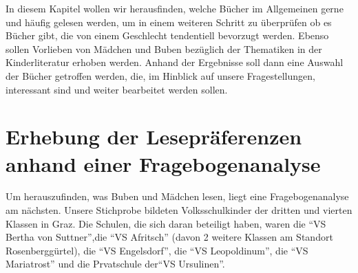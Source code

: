 In diesem Kapitel wollen wir herausfinden, welche Bücher im Allgemeinen
gerne und häufig gelesen werden, um in einem weiteren Schritt zu
überprüfen ob es Bücher gibt, die von einem Geschlecht tendentiell
bevorzugt werden. Ebenso sollen Vorlieben von Mädchen und Buben
bezüglich der Thematiken in der Kinderliteratur erhoben werden. Anhand
der Ergebnisse soll dann eine Auswahl der Bücher getroffen werden, die,
im Hinblick auf unsere Fragestellungen, interessant sind und weiter
bearbeitet werden sollen.

\section{Erhebung der Lesepräferenzen anhand einer Fragebogenanalyse}

Um herauszufinden, was Buben und Mädchen lesen, liegt eine
Fragebogenanalyse am nächsten. Unsere Stichprobe bildeten
Volksschulkinder der dritten und vierten Klassen in Graz. Die Schulen,
die sich daran beteiligt haben, waren die ``VS Bertha von Suttner'',die
``VS Afritsch'' (davon 2 weitere Klassen am Standort Rosenberggürtel),
die ``VS Engelsdorf'', die ``VS Leopoldinum'', die ``VS Mariatrost'' und
die Prvatschule der``VS Ursulinen''.

